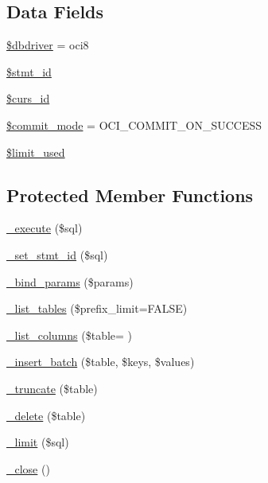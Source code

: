 \subsection*{Data Fields}
\begin{DoxyCompactItemize}
\item 
\hyperlink{class_c_i___d_b__oci8__driver_a0cde2a16322a023d040aa7f725877597}{\$dbdriver} = \textquotesingle{}oci8\textquotesingle{}
\item 
\hyperlink{class_c_i___d_b__oci8__driver_a1a97f17fd259cd27c73b65e6c3706ec0}{\$stmt\+\_\+id}
\item 
\hyperlink{class_c_i___d_b__oci8__driver_a75e7d18ad2e68ace3813533c9da2e179}{\$curs\+\_\+id}
\item 
\hyperlink{class_c_i___d_b__oci8__driver_a9b3b7163763603c5a0bcdfd819ae074d}{\$commit\+\_\+mode} = O\+C\+I\+\_\+\+C\+O\+M\+M\+I\+T\+\_\+\+O\+N\+\_\+\+S\+U\+C\+C\+E\+S\+S
\item 
\hyperlink{class_c_i___d_b__oci8__driver_a96df35d7e3e76bef21ebb80234fe59e8}{\$limit\+\_\+used}
\end{DoxyCompactItemize}
\subsection*{Protected Member Functions}
\begin{DoxyCompactItemize}
\item 
\hyperlink{class_c_i___d_b__oci8__driver_a114ab675d89bf8324a41785fb475e86d}{\+\_\+execute} (\$sql)
\item 
\hyperlink{class_c_i___d_b__oci8__driver_a266765febc9856083f55362268daba23}{\+\_\+set\+\_\+stmt\+\_\+id} (\$sql)
\item 
\hyperlink{class_c_i___d_b__oci8__driver_a66b8b06dadf7ff16c3877d5c024f5d2b}{\+\_\+bind\+\_\+params} (\$params)
\item 
\hyperlink{class_c_i___d_b__oci8__driver_a435c0f3ce54fe7daa178baa8532ebd54}{\+\_\+list\+\_\+tables} (\$prefix\+\_\+limit=F\+A\+L\+S\+E)
\item 
\hyperlink{class_c_i___d_b__oci8__driver_a2a81bb476a5c76fe6f763b0557c1e4c2}{\+\_\+list\+\_\+columns} (\$table= \textquotesingle{}\textquotesingle{})
\item 
\hyperlink{class_c_i___d_b__oci8__driver_a1978e1358c812587a46e242630365099}{\+\_\+insert\+\_\+batch} (\$table, \$keys, \$values)
\item 
\hyperlink{class_c_i___d_b__oci8__driver_aa029600528fc1ce660a23ff4b4667f95}{\+\_\+truncate} (\$table)
\item 
\hyperlink{class_c_i___d_b__oci8__driver_a133ea8446ded52589bd22cc9163d0896}{\+\_\+delete} (\$table)
\item 
\hyperlink{class_c_i___d_b__oci8__driver_a3a02ea06541b8ecc25a33a61651562c8}{\+\_\+limit} (\$sql)
\item 
\hyperlink{class_c_i___d_b__oci8__driver_a4d9082658000e5ede8312067c6dda9db}{\+\_\+close} ()
\end{DoxyCompactItemize}
